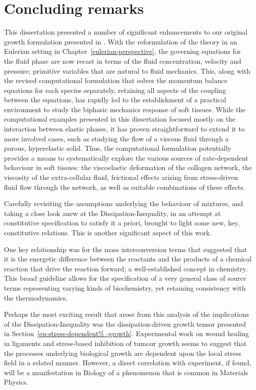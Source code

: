 \chapter{Concluding remarks}
\label{conclusions}

This dissertation presented a number of significant enhancements to
our original growth formulation presented in \citet{growthpaper}.
With the reformulation of the theory in an Eulerian setting in
Chapter~\ref{eulerian-perspective}, the governing equations for the
fluid phase are now recast in terms of the fluid concentration,
velocity and pressure; primitive variables that are natural to fluid
mechanics. This, along with the revised computational formulation that
solves the momentum balance equations for each species separately,
retaining all aspects of the coupling between the equations, has
rapidly led to the establishment of a practical environment to study
the biphasic mechanics response of soft tissues. While the
computational examples presented in this dissertation focused mostly
on the interaction between elastic phases, it has proven
straightforward to extend it to more involved cases, such as studying
the flow of a viscous fluid through a porous, hyperelastic
solid. Thus, the computational formulation potentially provides a
means to systematically explore the various sources of rate-dependent
behaviour in soft tissues: the viscoelastic deformation of the
collagen network, the viscosity of the extra-cellular fluid,
frictional effects arising from stress-driven fluid flow through the
network, as well as suitable combinations of these effects.

Carefully revisiting the assumptions underlying the behaviour of
mixtures, and taking a close look anew at the Dissipation-Inequality,
in an attempt at constitutive specification to satisfy it a priori,
brought to light some new, key, constitutive relations. This is
another significant aspect of this work.

One key relationship was for the mass interconversion terms that
suggested that it is the energetic difference between the reactants
and the products of a chemical reaction that drive the reaction
forward; a well-established concept in chemistry. This broad guideline
allows for the specification of a very general class of source terms
representing varying kinds of biochemistry, yet retaining consistency
with the thermodynamics.

Perhaps the most exciting result that arose from this analysis of the
implications of the Dissipation-Inequality was the dissipation-driven
growth tensor presented in Section~\ref{eu-stress-dependent%
  -growth}. Experimental work on wound healing in ligaments
\citep{Provenzanoetal:2003} and stress-based inhibition of tumour
growth \citep{jain1997} seems to suggest that the processes underlying
biological growth are dependent upon the local stress field in a
related manner. However, a direct correlation with experiment, if
found, will be a manifestation in Biology of a phenomenon that is
common in Materials Physics.

%

